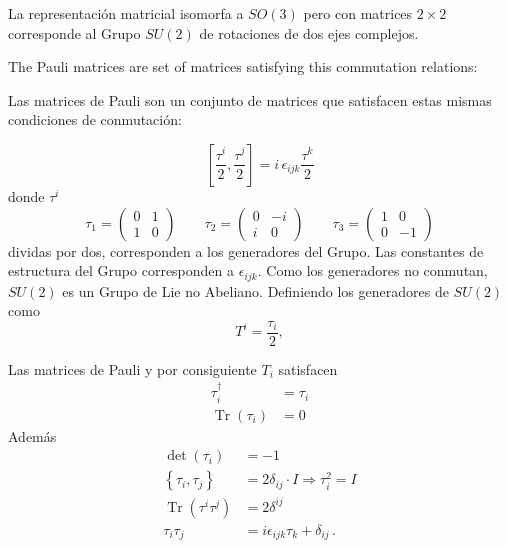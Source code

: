 La representación matricial isomorfa a $SO(3)$ pero con matrices $2\times2$ corresponde al Grupo $SU(2)$ de rotaciones de dos ejes complejos.
\begin{english}
  The Pauli matrices are set of matrices satisfying this commutation relations:
\end{english}
\begin{spanish}
Las matrices de Pauli son un conjunto de matrices que satisfacen estas mismas condiciones de conmutación: 
\end{spanish}
\begin{equation}
  \label{eq:paulialg}
  \left[\frac{\tau^i}{2},\frac{\tau^j}{2} \right]=i\,\epsilon_{ijk}\frac{\tau^k}{2}
\end{equation}
donde $\tau^i$ 
\begin{equation}
  \label{eq:paulimatr}
  \tau_1=
  \begin{pmatrix}
    0&1\\
    1&0
  \end{pmatrix} \qquad
 \tau_2=
  \begin{pmatrix}
    0&-i\\
    i&0
  \end{pmatrix}\qquad 
 \tau_3=
  \begin{pmatrix}
    1&0\\
    0&-1
  \end{pmatrix}
 \end{equation}
dividas por dos, corresponden a los generadores del Grupo. Las constantes de estructura del Grupo corresponden a $\epsilon_{ijk}$. Como los generadores no conmutan, $SU(2)$ es un Grupo de Lie no Abeliano. Definiendo los generadores de $SU(2)$ como
\begin{equation}
  T^i=\frac{\tau_i}{2},
\end{equation}

Las matrices de Pauli y por consiguiente $T_i$ satisfacen 
\begin{align}
  \tau_i^\dagger&=\tau_i\nonumber\\
  \operatorname{Tr}  \left(
    \tau_i
  \right)&=0
\end{align}
Además
\begin{align}
  \label{eq:64qft}
  \det
  \left(
    \tau_i
  \right)&=-1\nonumber\\
  \left\{ 
    \tau_i,\tau_j
  \right\}&=2\delta_{ij}\cdot I\Rightarrow\tau_i^2=I\nonumber \\
\operatorname{Tr} \left(\tau^i\tau^j\right)&=2\delta^{ij}\nonumber\\
\tau_i\tau_j&=i\epsilon_{ijk}\tau_k+\delta_{ij}\,.
\end{align}

